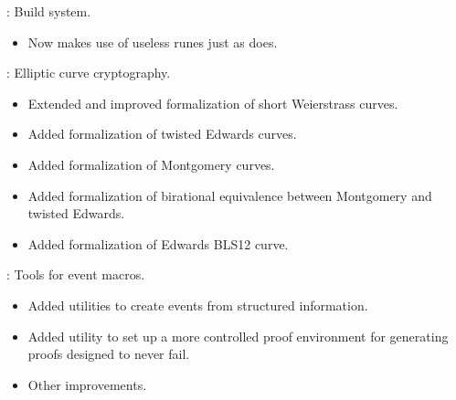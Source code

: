 
\begin{frame}

\implibtitle

:
Build system.
\begin{itemize}
\item Now  makes use of useless runes just as  does.
\end{itemize}

\end{frame}


\begin{frame}

\implibtitle

:
Elliptic curve cryptography.
\begin{itemize}
\item Extended and improved formalization of short Weierstrass curves.
\item Added formalization of twisted Edwards curves.
\item Added formalization of Montgomery curves.
\item Added formalization of birational equivalence between
      Montgomery and twisted Edwards.
\item Added formalization of Edwards BLS12 curve.
\end{itemize}

\end{frame}


\begin{frame}

\implibtitle

:
Tools for event macros.
\begin{itemize}
\item Added utilities to create events from structured information.
\item Added utility to set up a more controlled proof environment
      for generating proofs designed to never fail.
\item Other improvements.
\end{itemize}

\end{frame}

